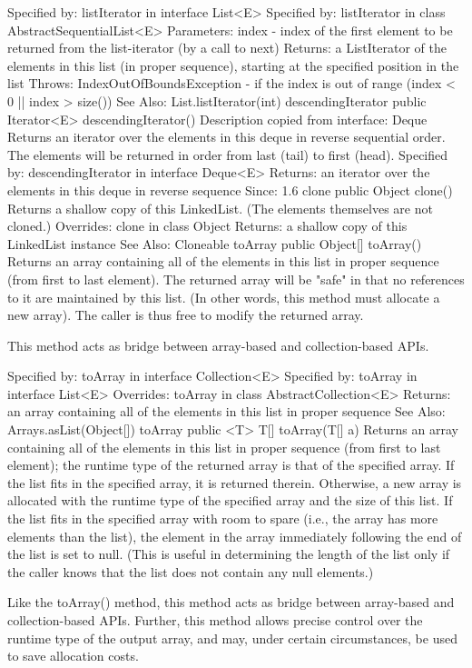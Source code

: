 \documentclass[babel]{book}
\begin{document}
Specified by:
listIterator in interface List<E>
Specified by:
listIterator in class AbstractSequentialList<E>
Parameters:
index - index of the first element to be returned from the list-iterator (by a call to next)
Returns:
a ListIterator of the elements in this list (in proper sequence), starting at the specified position in the list
Throws:
IndexOutOfBoundsException - if the index is out of range (index < 0 || index > size())
See Also:
List.listIterator(int)
descendingIterator
public Iterator<E> descendingIterator()
Description copied from interface: Deque
Returns an iterator over the elements in this deque in reverse sequential order. The elements will be returned in order from last (tail) to first (head).
Specified by:
descendingIterator in interface Deque<E>
Returns:
an iterator over the elements in this deque in reverse sequence
Since:
1.6
clone
public Object clone()
Returns a shallow copy of this LinkedList. (The elements themselves are not cloned.)
Overrides:
clone in class Object
Returns:
a shallow copy of this LinkedList instance
See Also:
Cloneable
toArray
public Object[] toArray()
Returns an array containing all of the elements in this list in proper sequence (from first to last element).
The returned array will be "safe" in that no references to it are maintained by this list. (In other words, this method must allocate a new array). The caller is thus free to modify the returned array.

This method acts as bridge between array-based and collection-based APIs.

Specified by:
toArray in interface Collection<E>
Specified by:
toArray in interface List<E>
Overrides:
toArray in class AbstractCollection<E>
Returns:
an array containing all of the elements in this list in proper sequence
See Also:
Arrays.asList(Object[])
toArray
public <T> T[] toArray(T[] a)
Returns an array containing all of the elements in this list in proper sequence (from first to last element); the runtime type of the returned array is that of the specified array. If the list fits in the specified array, it is returned therein. Otherwise, a new array is allocated with the runtime type of the specified array and the size of this list.
If the list fits in the specified array with room to spare (i.e., the array has more elements than the list), the element in the array immediately following the end of the list is set to null. (This is useful in determining the length of the list only if the caller knows that the list does not contain any null elements.)

Like the toArray() method, this method acts as bridge between array-based and collection-based APIs. Further, this method allows precise control over the runtime type of the output array, and may, under certain circumstances, be used to save allocation costs.
\end{document}
